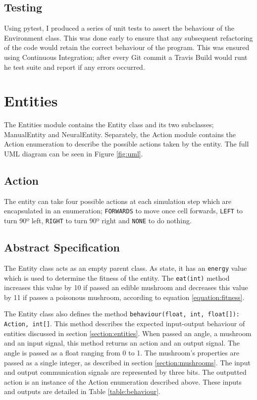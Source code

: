 \documentclass[12pt,a4paper,twoside,openright]{report}
\begin{document}
\subsection{Testing}

Using pytest, I produced a series of unit tests to assert the behaviour of the Environment class. This was done early to ensure that any subsequent refactoring of the code would retain the correct behaviour of the program. This was ensured using Continuous Integration; after every Git commit a Travis Build would runt he test suite and report if any errors occurred.

\section{Entities}

The Entities module contains the Entity class and its two subclasses; ManualEntity and NeuralEntity. Separately, the Action module contains the Action enumeration to describe the possible actions taken by the entity. The full UML diagram can be seen in Figure \ref{fig:uml}.

\subsection{Action}

The entity can take four possible actions at each simulation step which are encapsulated in an enumeration; \texttt{FORWARDS} to move once cell forwards, \texttt{LEFT} to turn 90º left, \texttt{RIGHT} to turn 90º right and \texttt{NONE} to do nothing.

\subsection{Abstract Specification}

The Entity class acts as an empty parent class. As state, it has an \texttt{energy} value which is used to determine the fitness of the entity. The \texttt{eat(int)} method increases this value by 10 if passed an edible mushroom and decreases this value by 11 if passes a poisonous mushroom, according to equation \ref{equation:fitness}. 

The Entity class also defines the method \texttt{behaviour(float, int, float[]): Action, int[]}. This method describes the expected input-output behaviour of entities discussed in section \ref{section:entities}. When passed an angle, a mushroom and an input signal, this method returns an action and an output signal. The angle is passed as a float ranging from 0 to 1. The mushroom's properties are passed as a single integer, as described in section \ref{section:mushrooms}. The input and output communication signals are represented by three bits. The outputted action is an instance of the Action enumeration described above. These inputs and outputs are detailed in Table \ref{table:behaviour}. 
\end{document}

